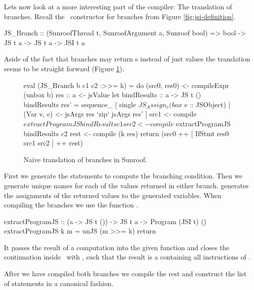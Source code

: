 

Lets now look at a more interesting part of the compiler: The translation of 
branches.
Recall the \JSI~constructor for branches from Figure \ref{fig:jsi-definition}.
\begin{Code}
JS_Branch :: (SunroofThread t, SunroofArgument a, Sunroof bool) 
          => bool -> JS t a -> JS t a  -> JSI t a
\end{Code}
Aside of the fact that branches may return s
instead of just  values the translation seems to 
be straight forward (Figure \ref{fig:branch-translation}).
\begin{figure}[h]
\begin{Code}
eval (JS_Branch b c1 c2 :>>= k) = do
  (src0, res0) <- compileExpr (unbox b)
  res :: a <- jsValue
  let bindResults :: a -> JS t ()
      bindResults res' =
        sequence_ [ single $ JS_Assign_ v (box $ e :: JSObject)
                  | (Var v, e) <- jsArgs res `zip` jsArgs res' ]
  src1 <- compile $ extractProgramJS bindResults c1
  src2 <- compile $ extractProgramJS bindResults c2
  rest <- compile (k res)
  return (src0 ++ [ IfStmt res0 src1 src2 ] ++ rest)
\end{Code}
\caption{Naive translation of branches in Sunroof.}
\label{fig:branch-translation}
\end{figure}
First we generate the statements to compute the branching condition.
Then we generate unique names for each of the values returned in 
either branch.  generates the assignments of
the returned values to the generated variables. When compiling 
the branches we use the function .
\begin{Code}
extractProgramJS :: (a -> JS t ()) -> JS t a -> Program (JSI t) ()
extractProgramJS k m = unJS (m >>= k) return
\end{Code}
It passes the result of a computation  
into the given function  and
closes the continuation inside \JS~with ,
such that the result is a  containing
all instructions of .

After we have compiled both branches we compile the rest and
construct the list of statements in a canonical fashion.

